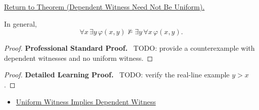 \newpage
{}
\label{prf:dependent-witness-not-uniform}

\begin{remark*}[Return]
\hyperref[thm:dependent-witness-not-uniform]{Return to Theorem (Dependent Witness Need Not Be Uniform).}
\end{remark*}

\begin{theorem*}
In general,
\[
\forall x\,\exists y\,\varphi(x,y)\not\models\exists y\,\forall x\,\varphi(x,y).
\]
\end{theorem*}

\begin{proof}
\textbf{Professional Standard Proof.}~
TODO: provide a counterexample with dependent witnesses and no uniform witness.
\end{proof}

\begin{proof}
\textbf{Detailed Learning Proof.}~
TODO: verify the real-line example \(y>x\).
\end{proof}

\begin{remark*}
\end{remark*}

\begin{dependencies}
\begin{itemize}
  \item \hyperref[thm:uniform-witness-implies-dependent-witness]{Uniform Witness Implies Dependent Witness}
\end{itemize}
\end{dependencies}

\clearpage
